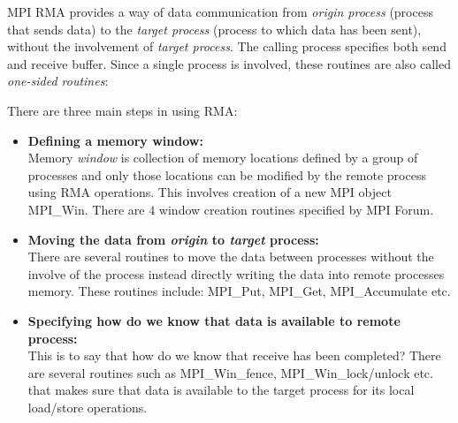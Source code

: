\documentclass[12pt]{article}
\begin{document}
MPI RMA provides a way of data communication from \textit{origin process} (process that sends data) to the \textit{target
process} (process to which data has been sent), without the involvement of \textit{target process}. The calling process specifies
both send and receive buffer. Since a single process is involved, these routines are also called \textit{one-sided routines}:

There are three main steps in using RMA:
\begin{itemize}
    \item \textbf{Defining a memory window:}\\
    Memory \textit{window} is collection of memory locations defined by a group of processes and only those locations can be
    modified by the remote process using RMA operations. This involves creation of a new MPI object {\ttfamily MPI\_Win}. There
    are $4$ window creation routines specified by MPI Forum.
    \item \textbf{Moving the data from \textit{origin} to \textit{target} process:}\\
    There are several routines to move the data between processes without the involve of the process instead directly writing the
    data into remote processes memory. These routines include: {\ttfamily MPI\_Put, MPI\_Get, MPI\_Accumulate} etc.
    \item \textbf{Specifying how do we know that data is available to remote process:}\\
    This is to say that how do we know that receive has been completed? There are several routines such as {\ttfamily MPI\_Win\_fence,
    MPI\_Win\_lock/unlock} etc. that makes sure that data is available to the target process for its local load/store operations.     
\end{itemize}
\end{document}
